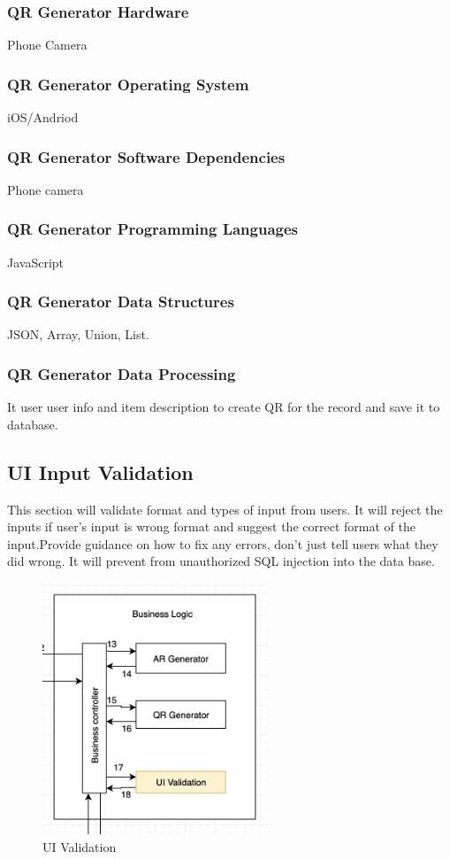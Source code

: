 \subsubsection{QR Generator Hardware}
Phone Camera

\subsubsection{QR Generator Operating System}
iOS/Andriod

\subsubsection{QR Generator Software Dependencies}
Phone camera

\subsubsection{QR Generator Programming Languages}
JavaScript

\subsubsection{QR Generator Data Structures}
JSON, Array, Union, List.

\subsubsection{QR Generator Data Processing}
It user user info and item description to create QR for the record and save it to database.

\subsection{UI Input Validation}
This section will validate format and types of input from users. It will reject the inputs if user's input is wrong format and suggest the correct format of the input.Provide guidance on how to fix any errors, don't just tell users what they did wrong. It will prevent from unauthorized SQL injection into the data base.

\begin{figure}[h!]
	\centering
 	\includegraphics[width=0.60\textwidth]{images/uivalidation}
 \caption{UI Validation}
\end{figure}

